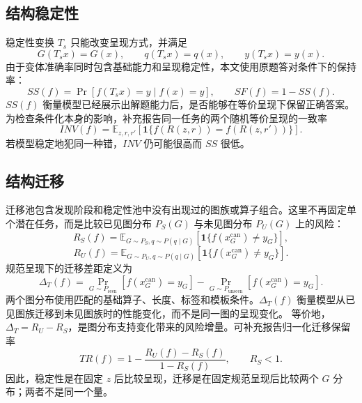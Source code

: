 \documentclass[UTF8,11pt,a4paper]{ctexart}
\theoremstyle{plain}
\begin{document}
\subsection{结构稳定性}

稳定性变换 $T_s$ 只能改变呈现方式，并满足
\begin{equation}
G(T_sx)=G(x),\qquad q(T_sx)=q(x),\qquad y(T_sx)=y(x).
\end{equation}
由于变体准确率同时包含基础能力和呈现稳定性，本文使用原题答对条件下的保持率：
\begin{equation}
SS(f)=\Pr[f(T_sx)=y\mid f(x)=y],
\qquad
SF(f)=1-SS(f).
\end{equation}
$SS(f)$ 衡量模型已经展示出解题能力后，是否能够在等价呈现下保留正确答案。
为检查条件化本身的影响，补充报告同一任务的两个随机等价呈现的一致率
\begin{equation}
INV(f)=\mathbb E_{z,r,r'}\left[
\mathbf 1\{f(R(z,r))=f(R(z,r'))\}\right].
\end{equation}
若模型稳定地犯同一种错，$INV$ 仍可能很高而 $SS$ 很低。

\subsection{结构迁移}

迁移池包含发现阶段和稳定性池中没有出现过的图族或算子组合。这里不再固定单个潜在任务，而是比较已见图分布 $P_S(G)$ 与未见图分布 $P_U(G)$ 上的风险：
\begin{equation}
R_S(f)=\mathbb E_{G\sim P_S,q\sim P(q\mid G)}
\left[\mathbf 1\{f(x_G^{\mathrm{can}})\neq y_G\}\right],
\end{equation}
\begin{equation}
R_U(f)=\mathbb E_{G\sim P_U,q\sim P(q\mid G)}
\left[\mathbf 1\{f(x_G^{\mathrm{can}})\neq y_G\}\right].
\end{equation}
规范呈现下的迁移差距定义为
\begin{equation}
\Delta_T(f)=
\Pr_{G\sim P_{\mathrm{seen}}}[f(x_G^{\mathrm{can}})=y_G]
-\Pr_{G\sim P_{\mathrm{unseen}}}[f(x_G^{\mathrm{can}})=y_G].
\end{equation}
两个图分布使用匹配的基础算子、长度、标签和模板条件。$\Delta_T(f)$ 衡量模型从已见图族迁移到未见图族时的性能变化，而不是同一图的呈现变化。
等价地，$\Delta_T=R_U-R_S$，是图分布支持变化带来的风险增量。可补充报告归一化迁移保留率
\begin{equation}
TR(f)=1-\frac{R_U(f)-R_S(f)}{1-R_S(f)},\qquad R_S<1.
\end{equation}
因此，稳定性是在固定 $z$ 后比较呈现，迁移是在固定规范呈现后比较两个 $G$ 分布；两者不是同一个量。
\end{document}
